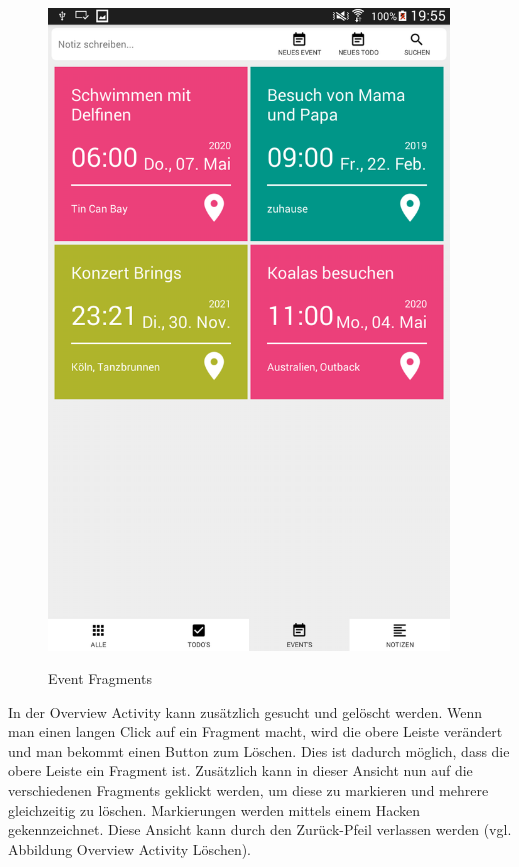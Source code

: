 \begin{figure}[H]
\centering
\begin{minipage}[t]{1\textwidth} %
\caption{Event Fragments} %
\includegraphics[height=17cm]{img/FragmentE}\\ %
\end{minipage}
\end{figure}

In der Overview Activity kann zusätzlich gesucht und gelöscht werden. Wenn man einen langen Click auf ein Fragment macht, wird die obere Leiste verändert und man bekommt einen Button zum Löschen. Dies ist dadurch möglich, dass die obere Leiste ein Fragment ist. Zusätzlich kann in dieser Ansicht nun auf die verschiedenen Fragments geklickt werden, um diese zu markieren und mehrere gleichzeitig zu löschen. Markierungen werden mittels einem Hacken gekennzeichnet. Diese Ansicht kann durch den Zurück-Pfeil verlassen werden (vgl. Abbildung Overview Activity Löschen).

